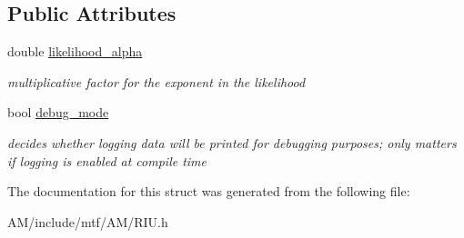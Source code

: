 \subsection*{Public Attributes}
\begin{DoxyCompactItemize}
\item 
\hypertarget{structRIUParams_ae015e72075a4e62df51e7064fedcf5f3}{double \hyperlink{structRIUParams_ae015e72075a4e62df51e7064fedcf5f3}{likelihood\-\_\-alpha}}\label{structRIUParams_ae015e72075a4e62df51e7064fedcf5f3}

\begin{DoxyCompactList}\small\item\em multiplicative factor for the exponent in the likelihood \end{DoxyCompactList}\item 
\hypertarget{structRIUParams_a6b30336433701d07a668f8c4d972a8bd}{bool \hyperlink{structRIUParams_a6b30336433701d07a668f8c4d972a8bd}{debug\-\_\-mode}}\label{structRIUParams_a6b30336433701d07a668f8c4d972a8bd}

\begin{DoxyCompactList}\small\item\em decides whether logging data will be printed for debugging purposes; only matters if logging is enabled at compile time \end{DoxyCompactList}\end{DoxyCompactItemize}


The documentation for this struct was generated from the following file\-:\begin{DoxyCompactItemize}
\item 
A\-M/include/mtf/\-A\-M/R\-I\-U.\-h\end{DoxyCompactItemize}

